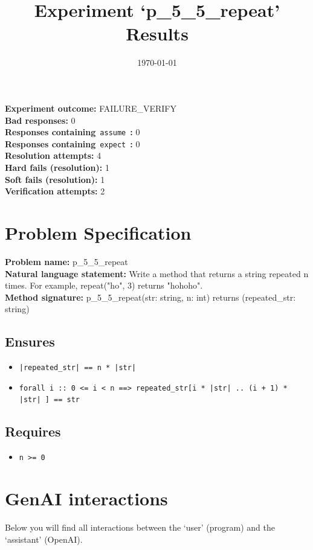 \documentclass{article}
\begin{document}
\title{Experiment `p\_5\_5\_repeat' Results}
\author{\today}
\date{}
\maketitle
\textbf{Experiment outcome: }FAILURE\_VERIFY
\\\textbf{Bad responses: }0
\\\textbf{Responses containing}~\texttt{assume}~\textbf{: }0
\\\textbf{Responses containing}~\texttt{expect}~\textbf{: }0
\\\textbf{Resolution attempts: }4
\\\textbf{Hard fails (resolution): }1
\\\textbf{Soft fails (resolution): }1
\\\textbf{Verification attempts: }2
\section*{Problem Specification}
\textbf{Problem name: }p\_5\_5\_repeat
\\\textbf{Natural language statement: }Write a method that returns a string repeated n times. For example, repeat("ho", 3) returns "hohoho".
\\\textbf{Method signature: }p\_5\_5\_repeat(str: string, n: int) returns (repeated\_str: string)
\subsection*{Ensures}
\begin{itemize}
\item \texttt{|repeated\_str| == n * |str|}
\item \texttt{forall i :: 0 <= i < n ==> repeated\_str[i * |str| .. (i + 1) * |str| ] == str}
\end{itemize}
\subsection*{Requires}
\begin{itemize}
\item \texttt{n >= 0}
\end{itemize}
\clearpage
\section*{GenAI interactions}
Below you will find all interactions between the `user' (program) and the `assistant' (OpenAI).
\end{document}

